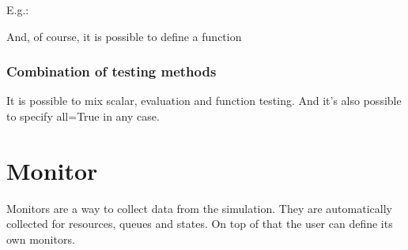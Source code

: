 \documentclass[letterpaper,10pt,english]{sphinxmanual}
\begin{document}
E.g.:

\begin{sphinxVerbatim}[commandchars=\\\{\}]
         
        
\end{sphinxVerbatim}

And, of course, it is possible to define a function

\begin{sphinxVerbatim}[commandchars=\\\{\}]
 
        
       


  
  
\end{sphinxVerbatim}


\subsection{Combination of testing methods}
\label{\detokenize{State:combination-of-testing-methods}}
It is possible to mix scalar, evaluation and function testing. And it’s also possible to specify all=True
in any case.


\chapter{Monitor}
\label{\detokenize{Monitor:monitor}}\label{\detokenize{Monitor::doc}}
Monitors are a way to collect data from the simulation. They are automatically collected
for resources, queues and states. On top of that the user can define its own monitors.
\end{document}
